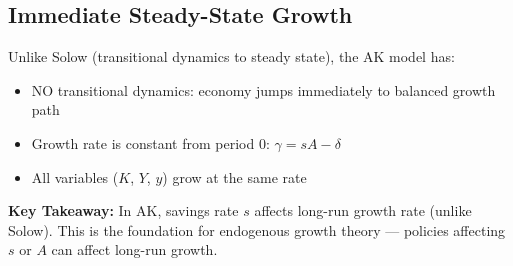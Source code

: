 \documentclass[a4paper,11pt]{article}
\begin{document}
\subsection{Immediate Steady-State Growth}

Unlike Solow (transitional dynamics to steady state), the AK model has:
\begin{itemize}
    \item NO transitional dynamics: economy jumps immediately to balanced growth path
    \item Growth rate is constant from period 0: $\gamma = sA - \delta$
    \item All variables ($K$, $Y$, $y$) grow at the same rate
\end{itemize}

\begin{resultbox}
\textbf{Key Takeaway:} In AK, savings rate $s$ affects long-run growth rate (unlike Solow). This is the foundation for endogenous growth theory — policies affecting $s$ or $A$ can affect long-run growth.
\end{resultbox}
\end{document}
